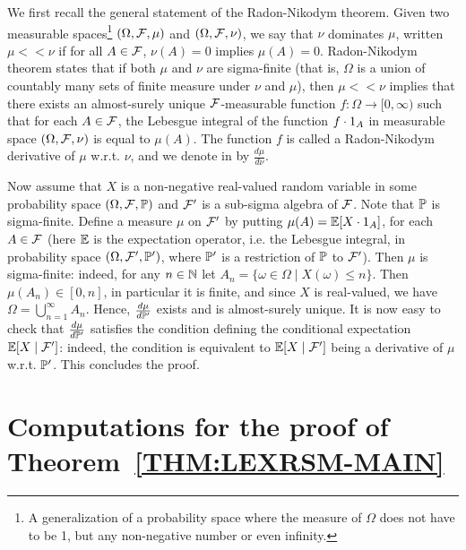 We first recall the general statement of the Radon-Nikodym theorem. Given two measurable spaces\footnote{A generalization of a probability space where the measure of $\Omega$ does not have to be 1, but any non-negative number or even infinity.} $(\Omega,\mathcal{F},\mu)$ and $(\Omega,\mathcal{F},\nu)$, we say that $\nu$ dominates $\mu$, written $\mu<<\nu$ if for all $A\in \mathcal{F}$, $\nu(A)=0$ implies $\mu(A)=0$. Radon-Nikodym theorem states that if both $\mu$ and $\nu$ are sigma-finite (that is, $\Omega$ is a union of countably many sets of finite measure under $\nu$ and $\mu$), then $\mu<<\nu$ implies that there exists an almost-surely unique $\mathcal{F}$-measurable function $f\colon \Omega\rightarrow [0,\infty)$ such that for each $A \in\mathcal{F}$, the Lebesgue integral of the function $f\cdot{1}_{A}$ in measurable space  $(\Omega,\mathcal{F},\nu)$ is equal to $\mu(A)$. The function $f$ is called a Radon-Nikodym derivative of $\mu$ w.r.t. $\nu$, and we denote in by $\frac{d\mu}{d\nu}$.

Now assume that $X$ is a non-negative real-valued random variable in some probability space $(\Omega,\mathcal{F},\mathbb{P})$ and $\mathcal{F}'$ is a sub-sigma algebra of $\mathcal{F}$. Note that $\mathbb{P}$ is sigma-finite. Define a measure $\mu$ on $\mathcal{F}'$ by putting $\mu(A)=\mathbb{E}[X\cdot{1}_{A}]$, for each $A\in \mathcal{F}$ (here $\mathbb{E}$ is the expectation operator, i.e. the Lebesgue integral, in probability space $(\Omega,\mathcal{F}',\mathbb{P}')$, where $\mathbb{P}'$ is a restriction of $\mathbb{P}$ to $\mathcal{F}'$). Then $\mu$ is sigma-finite: indeed, for any $n\in \mathbb{N}$ let $A_n = \{\omega\in\Omega\mid X(\omega)\leq n\}$. Then $\mu(A_n)\in [0,n]$, in particular it is finite, and since $X$ is real-valued, we have $\Omega=\bigcup_{n=1}^{\infty} A_n$. Hence, $\frac{d\mu}{d\mathbb{P}'}$ exists and is almost-surely unique. It is now easy to check that $\frac{d\mu}{d\mathbb{P}'}$ satisfies the condition defining the conditional expectation $\mathbb{E}[X\mid \mathcal{F}']$: indeed, the condition is equivalent to $\mathbb{E}[X\mid \mathcal{F}']$ being a derivative of $\mu$ w.r.t. $\mathbb{P}'$. This concludes the proof.


\section{Computations for the proof of Theorem~\ref{THM:LEXRSM-MAIN}}


